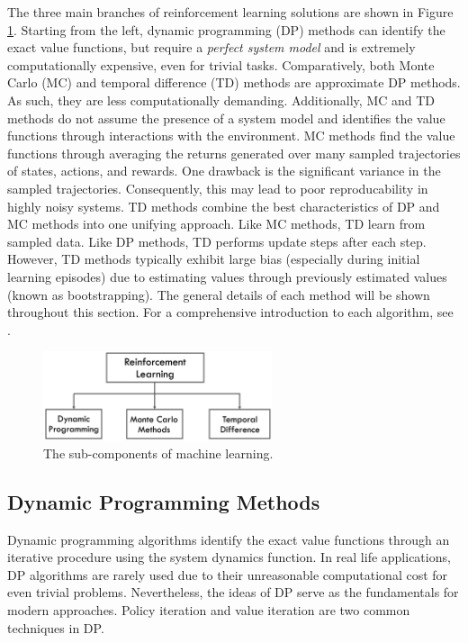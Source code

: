 The three main branches of reinforcement learning solutions are shown in Figure \ref{fig:RL_methods}. Starting from the left, dynamic programming (DP) methods can identify the exact value functions, but require a \textit{perfect system model} and is extremely computationally expensive, even for trivial tasks.  Comparatively, both Monte Carlo (MC) and temporal difference (TD) methods are approximate DP methods.  As such, they are less computationally demanding.  Additionally, MC and TD methods do not assume the presence of a system model and identifies the value functions through interactions with the environment. MC methods find the value functions through averaging the returns generated over many sampled trajectories of states, actions, and rewards.  One drawback is the significant variance in the sampled trajectories. Consequently, this may lead to poor reproducability in highly noisy systems. TD methods combine the best characteristics of DP and MC methods into one unifying approach. Like MC methods, TD learn from sampled data.  Like DP methods, TD performs update steps after each step. However, TD methods typically exhibit large bias (especially during initial learning episodes) due to estimating values through previously estimated values (known as bootstrapping). The general details of each method will be shown throughout this section.  For a comprehensive introduction to each algorithm, see \cite{sutton}.

\begin{figure}[H]
    \centering
    \includegraphics[width=0.6\textwidth]{images/ch1/RL_methods.jpeg}
    \caption{The sub-components of machine learning.}
    \label{fig:RL_methods}
\end{figure}   


\subsection{Dynamic Programming Methods}
Dynamic programming algorithms identify the exact value functions through an iterative procedure using the system dynamics function. In real life applications, DP algorithms are rarely used due to their unreasonable computational cost for even trivial problems. Nevertheless, the ideas of DP serve as the fundamentals for modern approaches. Policy iteration and value iteration are two common techniques in DP.  

